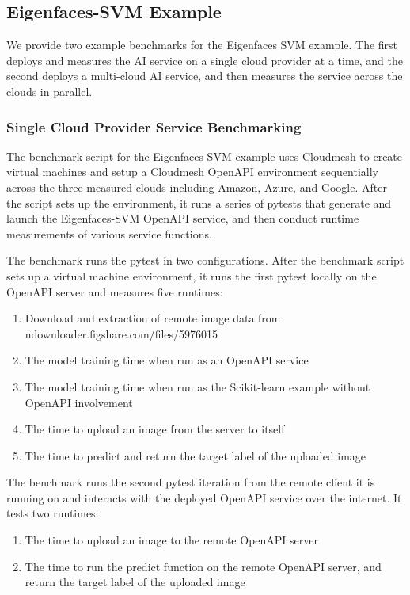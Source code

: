 \subsection{Eigenfaces-SVM Example}\label{eigenfaces-svm-example}

We provide two example benchmarks for the Eigenfaces SVM example. The
first deploys and measures the AI service on a single cloud provider at
a time, and the second deploys a multi-cloud AI service, and then
measures the service across the clouds in parallel.

\subsubsection{Single Cloud Provider Service
Benchmarking}\label{single-cloud-provider-service-benchmarking}

The benchmark script for the Eigenfaces SVM example uses Cloudmesh to
create virtual machines and setup a Cloudmesh OpenAPI environment
sequentially across the three measured clouds including Amazon, Azure,
and Google. After the script sets up the environment, it runs a series
of pytests that generate and launch the Eigenfaces-SVM OpenAPI service,
and then conduct runtime measurements of various service functions.

The benchmark runs the pytest in two configurations. After the benchmark
script sets up a virtual machine environment, it runs the first pytest
locally on the OpenAPI server and measures five runtimes:

\begin{enumerate}
\def\labelenumi{\arabic{enumi}.}
\tightlist
\item
  Download and extraction of remote image data from
  ndownloader.figshare.com/files/5976015
\item
  The model training time when run as an OpenAPI service
\item
  The model training time when run as the Scikit-learn example without
  OpenAPI involvement
\item
  The time to upload an image from the server to itself
\item
  The time to predict and return the target label of the uploaded image
\end{enumerate}

The benchmark runs the second pytest iteration from the remote client it
is running on and interacts with the deployed OpenAPI service over the
internet. It tests two runtimes:

\begin{enumerate}
\def\labelenumi{\arabic{enumi}.}
\tightlist
\item
  The time to upload an image to the remote OpenAPI server
\item
  The time to run the predict function on the remote OpenAPI server, and
  return the target label of the uploaded image
\end{enumerate}

